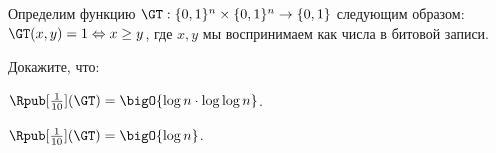 Определим функцию $\GT: \{0, 1\}^n \times \{0, 1\}^n \to \{0, 1\}$ следующим образом: $\GT(x, y) = 1
\Leftrightarrow x \ge y$, где $x, y$ мы воспринимаем как числа в битовой записи.

Докажите, что:
\begin{enumcyr}
    \item $\Rpub[\frac{1}{10}](\GT) = \bigO{\log n \cdot \log\log n}$.
    \item $\Rpub[\frac{1}{10}](\GT) = \bigO{\log n}$.
\end{enumcyr}

